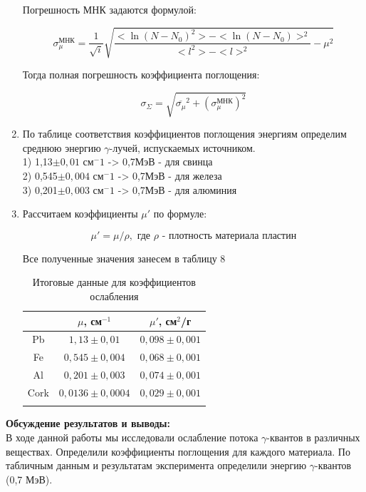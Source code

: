 \documentclass[a4paper, 12pt]{article}%
\begin{document}
\begin{enumerate}
	Погрешность МНК задаются формулой:
	
	$$ \sigma_{\mu}^{\text{МНК}} = \frac{1}{\sqrt{i}} \sqrt{\frac{<\ln(N-N_0)^2> - <\ln(N-N_0)>^2}{<l^2> - <l>^2} - \mu^2} $$
	
	Тогда полная погрешность коэффициента поглощения:
	
	$$ \sigma_{\Sigma} = \sqrt{\overline{\sigma_{\mu}}^2 + {(\sigma_{\mu}^{\text{МНК}})}^2 } $$
	
	
\item 	По таблице соответствия коэффициентов поглощения энергиям определим среднюю энергию $\gamma$-лучей, испускаемых источником.\\
	
	1) 1,13$\pm 0,01\text{ см}^-1$ -> 0,7МэВ - для свинца\\
	2) 0,545$\pm 0,004\text{ см}^-1$ -> 0,7МэВ - для железа\\
	3) 0,201$\pm 0,003\text{ см}^-1$ -> 0,7МэВ - для алюминия\\
	
	\item Рассчитаем коэффициенты $\mu'$ по формуле:
	
	$$ \mu' = \mu/\rho, \text{		где $\rho$ - плотность материала пластин}$$ 
	
	Все полученные значения занесем в таблицу 8
	
	\begin{longtable}{|c|c|c|}
		\hline
		&    $\mu$, см$^{-1}$  & $\mu'$, см$^2$/г  \\ \hline
		Pb & $1,13\pm0,01$     & $0,098\pm0,001$   \\ \hline
		Fe & $0,545\pm0,004$    & $0,068\pm0,001$   \\ \hline
		Al & $0,201\pm0,003$    & $0,074\pm0,001$   \\ \hline
		Cork& $0,0136\pm0,0004$    & $0,029\pm0,001$   \\ \hline
		
		\caption{Итоговые данные для коэффициентов ослабления}
	\end{longtable}
	
	
	
	\end{enumerate}
	
	
	
	\textbf{Обсуждение результатов и выводы: }\\
	
	В ходе данной работы мы исследовали ослабление потока $\gamma$-квантов в различных веществах. Определили коэффициенты поглощения для каждого материала. По табличным данным и результатам эксперимента определили энергию $\gamma$-квантов (0,7 МэВ).
	
\end{document}
